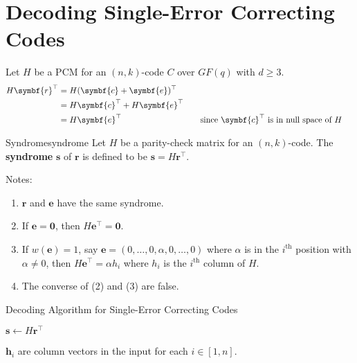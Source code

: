 \section{Decoding Single-Error Correcting Codes}
Let $ H $ be a PCM for an $ (n,k) $-code $ C $ over $ GF(q) $
with $ d\geqslant 3 $.
\begin{align*}
    H\symbf{r}^\top
     & =H(\symbf{c}+\symbf{e})^\top                                                                          \\
     & =H\symbf{c}^\top+H \symbf{e}^\top                                                                     \\
     & =H\symbf{e}^\top                  & \quad & \text{since $ \symbf{c}^\top $ is in null space of $ H$ }
\end{align*}

\begin{Definition}{Syndrome}{syndrome}
    Let $ H $ be a parity-check matrix for an $ (n,k) $-code.
    The \textbf{syndrome} $ \symbf{s} $ of $ \symbf{r} $
    is defined to be $ \symbf{s}=H\symbf{r}^\top $.
\end{Definition}

Notes:
\begin{enumerate}[label=(\arabic*)]
    \item $ \symbf{r} $ and $ \symbf{e} $ have the same syndrome.
    \item If $ \symbf{e}=\symbf{0} $, then $ H\symbf{e}^\top=\symbf{0} $.
    \item If $ w(\symbf{e})=1 $, say $ \symbf{e}=(0,\ldots,0,\alpha,0,\ldots,0) $
          where $ \alpha $ is in the $ i^{\text{th}} $ position with $ \alpha \neq 0 $,
          then $ H\symbf{e}^\top=\alpha h_i $ where $ h_i $ is the $ i^{\text{th}} $
          column of $ H $.
    \item The converse of (2) and (3) are false.
\end{enumerate}

\begin{algorithm}
    \DontPrintSemicolon{}
    \caption{Decoding Algorithm for Single-Error Correcting Codes}\label{alg:Decoding Algorithm for Single-Error Correcting Codes}

    $ \symbf{s}\gets H\symbf{r}^\top $\;
     {
    }
     {
         {
        }
    }
    \Return{}
\end{algorithm}
\begin{Remark}{}{}
    $ \symbf{h}_i $ are column vectors in the input for each $ i\in[1,n] $.
\end{Remark}

